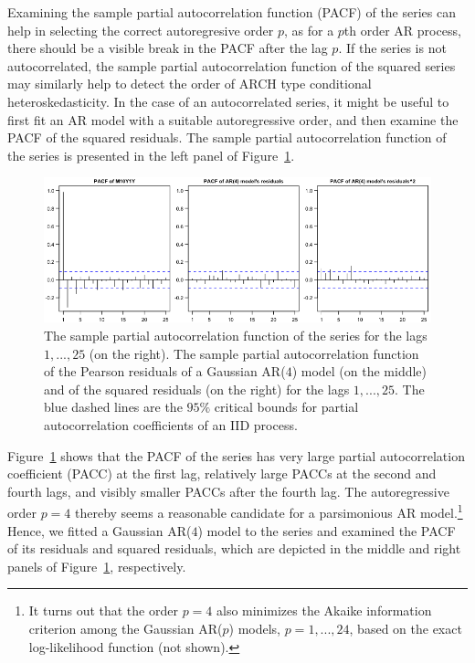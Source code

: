 \documentclass[nojss]{jss} %
\begin{document}
Examining the sample partial autocorrelation function (PACF) of the series can help in selecting the correct autoregresive order $p$, as for a $p$th order AR process, there should be a visible break in the PACF after the lag $p$. If the series is not autocorrelated, the sample partial autocorrelation function of the squared series may similarly help to detect the order of ARCH type conditional heteroskedasticity. In the case of an autocorrelated series, it might be useful to first fit an AR model with a suitable autoregressive order, and then examine the PACF of the squared residuals.
The sample partial autocorrelation function of the series  \citep[calculated using the function  from the package ,][]{R} is presented in the left panel of Figure~\ref{fig:pacf}.
%
\begin{figure}
  \centering
  \includegraphics{figures/pacfplot.png}
  \caption{The sample partial autocorrelation function of the series  for the lags $1,...,25$ (on the right). The sample partial autocorrelation function of the Pearson residuals of a Gaussian AR($4$) model (on the middle) and of the squared residuals (on the right) for the lags $1,...,25$. The blue dashed lines are the $95\%$ critical bounds for partial autocorrelation coefficients of an IID process.}
\label{fig:pacf}
\end{figure}
%

Figure~\ref{fig:pacf} shows that the PACF of the series has very large partial autocorrelation coefficient (PACC) at the first lag, relatively large PACCs at the second and fourth lags, and visibly smaller PACCs after the fourth lag. The autoregressive order $p=4$ thereby seems a reasonable candidate for a parsimonious AR model.\footnote{It turns out that the order $p=4$ also minimizes the Akaike information criterion among the Gaussian AR($p$) models, $p=1,...,24$, based on the exact log-likelihood function (not shown).} Hence, we fitted a Gaussian AR($4$) model to the series and examined the PACF of its residuals and squared residuals, which are depicted in the middle and right panels of Figure~\ref{fig:pacf}, respectively.
\end{document}
